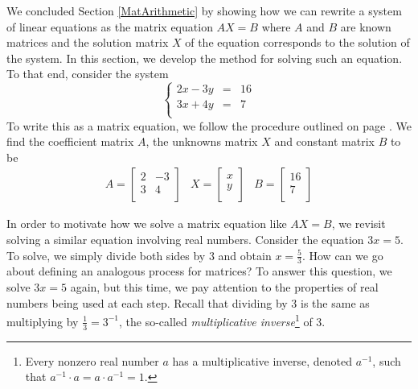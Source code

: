 

\setcounter{footnote}{0}

\label{MatMethods}

\setlength{\extrarowheight}{0pt}

We concluded Section \ref{MatArithmetic} by showing how we can rewrite a system of linear equations as the matrix equation $AX=B$ where $A$ and $B$ are known matrices and the solution matrix $X$ of the equation corresponds to the solution of the system. In this section, we develop the method for solving such an equation.  To that end, consider the system \[ \left\{ \begin{array}{rcr} 2x-3y & = & 16 \\ 3x+4y & = & 7 \\ \end{array} \right.\]  To write this as a matrix equation, we follow the procedure outlined on page \pageref{systemasmatrixeqn}.  We find the coefficient matrix $A$, the unknowns matrix $X$ and constant matrix $B$ to be 
\[ \begin{array}{ccc} 

A = \left[ \begin{array}{rr} 2 & -3 \\ 3 & 4 \\ \end{array} \right] 

&

 X = \left[ \begin{array}{r} x \\ y \\ \end{array} \right]
 
&

 B = \left[ \begin{array}{r} 16 \\ 7 \\ \end{array} \right] 
 \end{array}\]   
 
In order to motivate how we solve a matrix equation like $AX = B$, we revisit solving a similar equation involving real numbers. Consider the equation $3x = 5$.  To solve,  we simply divide both sides by $3$ and obtain $x = \frac{5}{3}$.  How can we go about defining an analogous process for matrices? To answer this question, we solve $3x=5$ again, but this time, we pay attention to the properties of real numbers being used at each step.  Recall that dividing by $3$ is the same as multiplying by $\frac{1}{3} = 3^{-1}$, the so-called \textit{multiplicative inverse}\footnote{Every nonzero real number $a$ has a multiplicative inverse, denoted $a^{-1}$, such that  $a^{-1} \cdot a = a \cdot a^{-1} = 1$.} of $3$.


